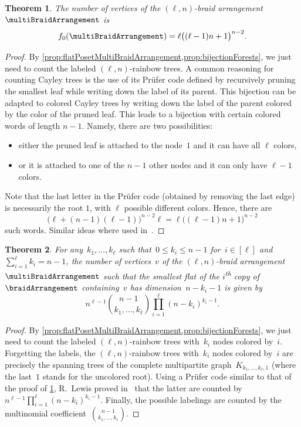 \documentclass{amsart}
\newcommand{\vincent}[1]{\todo[color=blue!30]{\rm #1 \\ \hfill --- V.}}
\newtheorem{theorem}{Theorem}[section]
\theoremstyle{definition}
\newcommand{\ordinal}{\textsuperscript{th}} %
\begin{document}
\begin{theorem}
\label{thm:verticesMultiBraidArrangement}
The number of vertices of the $(\ell,n)$-braid arrangement~$\multiBraidArrangement$ is
\[
f_0(\multiBraidArrangement) = \ell \big( (\ell-1) n + 1 \big)^{n-2}.
\]
\end{theorem}

\begin{proof}
By \cref{prop:flatPosetMultiBraidArrangement,prop:bijectionForests}, we just need to count the labeled $(\ell,n)$-rainbow trees.
A common reasoning for counting Cayley trees is the use of its Prüfer code defined by recursively pruning the smallest leaf while writing down the label of its parent.
This bijection can be adapted to colored Cayley trees by writing down the label of the parent colored by the color of the pruned leaf.
This leads to a bijection with certain colored words of length $n-1$.
Namely, there are two possibilities:
\begin{itemize}
\item either the pruned leaf is attached to the node~$1$ and it can have all $\ell$ colors,
\item or it is attached to one of the $n-1$ other nodes and it can only have $\ell-1$ colors.
\end{itemize}
Note that the last letter in the Prüfer code (obtained by removing the last edge) is necessarily the root $1$, with $\ell$ possible different colors.
Hence, there are 
\[
\big( \ell+(n-1)(\ell-1) \big)^{n-2} \ell = \ell \big( (\ell-1) n + 1 \big)^{n-2}
\]
such words.
Similar ideas where used in~\cite{Lewis}.
\vincent{Improve citation?}
\end{proof}

\begin{theorem}
\label{thm:verticesRefinedMultiBraidArrangement}
For any~$k_1, \dots, k_\ell$ such that~$0 \le k_i \le n-1$ for~$i \in [\ell]$ and~${\sum_{i=1}^\ell k_i = n-1}$, the number of vertices~$v$ of the $(\ell,n)$-braid arrangement~$\multiBraidArrangement$ such that the smallest flat of the $i$\ordinal{} copy of~$\braidArrangement$ containing~$v$ has dimension~$n-k_i-1$ is given by
\[
n^{\ell-1} \binom{n-1}{k_1, \dots, k_\ell} \prod_{i=1}^\ell (n-k_i)^{k_i-1}.
\]
\end{theorem}

\begin{proof}
By \cref{prop:flatPosetMultiBraidArrangement,prop:bijectionForests}, we just need to count the labeled $(\ell,n)$-rainbow trees with~$k_i$ nodes colored by~$i$.
Forgetting the labels, the $(\ell,n)$-rainbow trees with~$k_i$ nodes colored by~$i$ are precisely the spanning trees of the complete multipartite graph~$K_{k_1, \dots, k_\ell, 1}$ (where the last~$1$ stands for the uncolored root).
Using a Pr\"ufer code similar to that of the proof of \cref{thm:verticesMultiBraidArrangement}, R.~Lewis proved in~\cite{Lewis} that the latter are counted by~${n^{\ell-1} \prod_{i=1}^\ell (n-k_i)^{k_i-1}}$.
Finally, the possible labelings are counted by the multinomial coefficient~$\binom{n-1}{k_1, \dots, k_\ell}$.
\end{proof}
\end{document}
